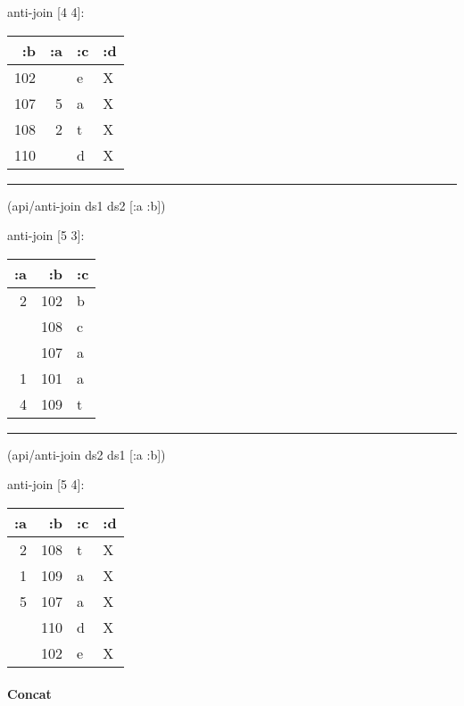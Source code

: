 \documentclass[]{article}
\newenvironment{Shaded}{\begin{snugshade}}{\end{snugshade}}
\newcommand{\AttributeTok}[1]{\textcolor[rgb]{0.77,0.63,0.00}{#1}}
\newcommand{\NormalTok}[1]{#1}
\let\oldparagraph\paragraph
\renewcommand{\paragraph}[1]{\oldparagraph{#1}\mbox{}}
\begin{document}
anti-join {[}4 4{]}:

\begin{longtable}[]{@{}rrll@{}}
\toprule
:b & :a & :c & :d\tabularnewline
\midrule
\endhead
102 & & e & X\tabularnewline
107 & 5 & a & X\tabularnewline
108 & 2 & t & X\tabularnewline
110 & & d & X\tabularnewline
\bottomrule
\end{longtable}

\begin{center}\rule{0.5\linewidth}{0.5pt}\end{center}

\begin{Shaded}
\begin{Highlighting}[]
\NormalTok{(api/anti-join ds1 ds2 [}\AttributeTok{:a} \AttributeTok{:b}\NormalTok{])}
\end{Highlighting}
\end{Shaded}

anti-join {[}5 3{]}:

\begin{longtable}[]{@{}rrl@{}}
\toprule
:a & :b & :c\tabularnewline
\midrule
\endhead
2 & 102 & b\tabularnewline
& 108 & c\tabularnewline
& 107 & a\tabularnewline
1 & 101 & a\tabularnewline
4 & 109 & t\tabularnewline
\bottomrule
\end{longtable}

\begin{center}\rule{0.5\linewidth}{0.5pt}\end{center}

\begin{Shaded}
\begin{Highlighting}[]
\NormalTok{(api/anti-join ds2 ds1 [}\AttributeTok{:a} \AttributeTok{:b}\NormalTok{])}
\end{Highlighting}
\end{Shaded}

anti-join {[}5 4{]}:

\begin{longtable}[]{@{}rrll@{}}
\toprule
:a & :b & :c & :d\tabularnewline
\midrule
\endhead
2 & 108 & t & X\tabularnewline
1 & 109 & a & X\tabularnewline
5 & 107 & a & X\tabularnewline
& 110 & d & X\tabularnewline
& 102 & e & X\tabularnewline
\bottomrule
\end{longtable}

\paragraph{Concat}\label{concat}
\end{document}

